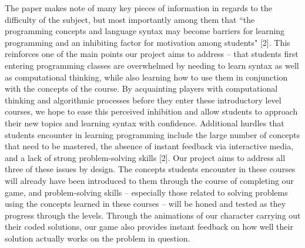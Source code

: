 The paper makes note of many key pieces of information in regards to the difficulty of the subject, but most importantly among them that ``the programming concepts and language syntax may become barriers for learning programming and an inhibiting factor for motivation among students" [2]. This reinforces one of the main points our project aims to address -- that students first entering programming classes are overwhelmed by needing to learn syntax as well as computational thinking, while also learning how to use them in conjunction with the concepts of the course. By acquainting players with computational thinking and algorithmic processes before they enter these introductory level courses, we hope to ease this perceived inhibition and allow students to approach their new topics and learning syntax with confidence. Additional hurdles that students encounter in learning programming include the large number of concepts that need to be mastered, the absence of instant feedback via interactive media, and a lack of strong problem-solving skills [2]. Our project aims to address all three of these issues by design. The concepts students encounter in these courses will already have been introduced to them through the course of completing our game, and problem-solving skills -- especially those related to solving problems using the concepts learned in these courses -- will be honed and tested as they progress through the levels. Through the animations of our character carrying out their coded solutions, our game also provides instant feedback on how well their solution actually works on the problem in question.\\


